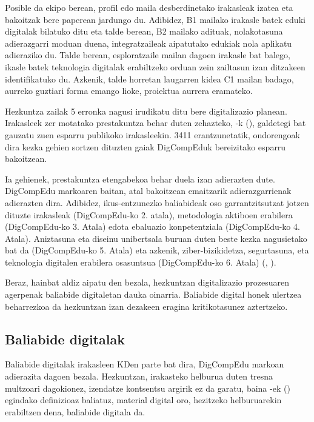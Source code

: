 Posible da ekipo berean, profil edo maila desberdinetako irakasleak izatea eta bakoitzak bere paperean jardungo du. Adibidez, B1 mailako irakasle batek eduki digitalak bilatuko ditu eta talde berean, B2 mailako adituak, nolakotasuna adierazgarri moduan duena, integratzaileak aipatutako edukiak nola aplikatu adieraziko du. Talde berean, esploratzaile mailan dagoen irakasle bat balego, ikasle batek teknologia digitalak erabiltzeko orduan zein zailtasun izan ditzakeen identifikatuko du. Azkenik, talde horretan laugarren kidea C1 mailan badago, aurreko guztiari forma emango lioke, proiektua aurrera eramateko.

Hezkuntza zailak 5 erronka nagusi irudikatu ditu bere digitalizazio planean. Irakasleek zer motatako prestakuntza behar duten zehazteko, \citeauthor{larralde2021}-k (\citeyear{larralde2021}), galdetegi bat gauzatu zuen esparru publikoko irakasleekin. 3411 erantzunetatik, ondorengoak dira kezka gehien sortzen dituzten gaiak DigCompEduk bereizitako esparru bakoitzean.

Ia gehienek, prestakuntza etengabekoa behar duela izan adierazten dute. DigCompEdu markoaren baitan, atal bakoitzean emaitzarik adierazgarrienak adierazten dira. Adibidez, ikus-entzunezko baliabideak oso garrantzitsutzat jotzen dituzte irakasleak (DigCompEdu-ko 2. atala), metodologia aktiboen erabilera (DigCompEdu-ko 3. Atala) edota ebaluazio konpetentziala (DigCompEdu-ko 4. Atala). Aniztasuna eta diseinu unibertsala buruan duten beste kezka nagusietako bat da (DigCompEdu-ko 5. Atala) eta azkenik, ziber-bizikidetza, segurtasuna, eta teknologia digitalen erabilera osasuntsua (DigCompEdu-ko 6. Atala) (\citeauthor{larralde2021}, \citeyear{larralde2021}).

Beraz, hainbat aldiz aipatu den bezala, hezkuntzan digitalizazio prozesuaren agerpenak baliabide digitaletan dauka oinarria. Baliabide digital honek ulertzea beharrezkoa da hezkuntzan izan dezakeen eragina kritikotasunez aztertzeko.

\subsection{Baliabide digitalak}\label{subsec:baldig}

Baliabide digitalak irakasleen KDen parte bat dira, DigCompEdu markoan adierazita dagoen bezala. Hezkuntzan, irakasteko helburua duten tresna multzoari dagokionez, izendatze kontsentsu argirik ez da garatu, baina \citeauthor{pinto2012recursos}-ek (\citeyear{pinto2012recursos}) egindako definizioaz baliatuz, material digital oro, hezitzeko helburuarekin erabiltzen dena, baliabide digitala da.

